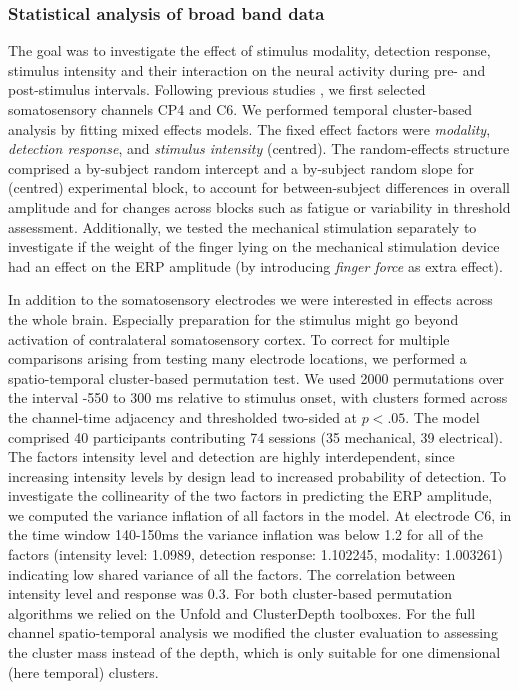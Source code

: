 \documentclass[11pt,a4paper,onecolumn]{article}
\begin{document}
\subsubsection*{Statistical analysis of broad band data}
\vspace{-7pt}

The goal was to investigate the effect of stimulus modality, detection response, stimulus intensity and their interaction on the neural activity during pre- and post-stimulus intervals.
Following previous studies \cite{forschackDissociableNeuralCorrelates2020, forsterERPResponsesReveal2025}, we first selected somatosensory channels CP4 and C6. We performed temporal cluster-based analysis
by fitting mixed effects models. The fixed effect factors were \textit{modality}, \textit{detection response}, and \textit{stimulus intensity} (centred). The random-effects structure comprised a by-subject random intercept and a by-subject random slope for (centred) experimental block, to account for between-subject differences in overall amplitude and for changes across blocks such as fatigue or variability in threshold assessment. Additionally, we tested the mechanical stimulation separately to investigate if the weight of the finger lying on the mechanical stimulation device had an effect on the ERP amplitude (by introducing \textit{finger force} as extra effect). %

In addition to the somatosensory electrodes we were interested in effects across the whole brain. Especially preparation for the stimulus might go beyond activation of contralateral somatosensory cortex. To correct for multiple comparisons arising from testing many electrode locations, we performed a spatio-temporal cluster-based permutation test. 
We used 2000 permutations over the interval -550 to 300 ms relative to stimulus onset, with clusters formed across the channel-time adjacency and thresholded two-sided at $p < .05$. The model comprised 40 participants contributing 74 sessions (35 mechanical, 39 electrical).
The factors intensity level and detection are highly interdependent, since increasing intensity levels by design lead to increased probability of detection. To investigate the collinearity of the two factors in predicting the ERP amplitude, we computed the variance inflation of all factors in the model. At electrode C6, in the time window 140-150ms the variance inflation was below 1.2 for all of the factors (intensity level: 1.0989, detection response: 1.102245, modality: 1.003261) indicating low shared variance of all the factors. The correlation between intensity level and response was 0.3. For both cluster-based permutation algorithms we relied on the Unfold  \cite{ehinger_unfold_2019} and ClusterDepth \cite{benedikt_ehinger_2026_18374557} toolboxes. For the full channel spatio-temporal analysis we modified the cluster evaluation to assessing the cluster mass instead of the depth, which is only suitable for one dimensional (here temporal) clusters.
\end{document}
